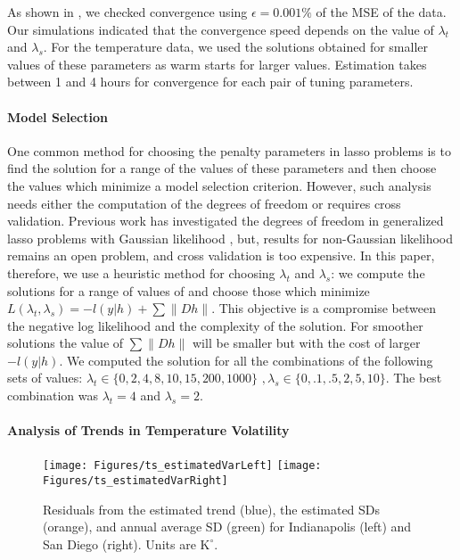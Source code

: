 \documentclass[letterpaper]{article} %
\newcommand{\autoref}{\Cref}
\begin{document}

As shown in \autoref{alg:linADMM}, we checked convergence using
$\epsilon=0.001\%$ of the MSE of the data.
Our simulations indicated that the
convergence speed depends on the value of $\lambda_t$ and
$\lambda_s$. For the temperature data, we used the solutions obtained for smaller values
of these parameters as warm starts for larger values. Estimation takes
between 1 and 4 hours for convergence for each pair of tuning parameters. 


\paragraph{Model Selection}
One common method for choosing the penalty parameters in lasso
problems is to find the solution for a range of the values of these
parameters and then choose the values which minimize a model selection
criterion. However, such analysis needs either the computation of the degrees
of freedom or requires cross validation. Previous work has
investigated the degrees of freedom in 
generalized lasso problems with Gaussian likelihood
\cite{tibshirani_degrees_2012,hu_dual_2015,zeng_geometry_2017}, but,
results for non-Gaussian likelihood remains an open problem, and cross
validation is too expensive. 
In this paper, therefore, we use a heuristic method for choosing $\lambda_t$ and
$\lambda_s$: we compute the solutions for a range of values of
and choose those which minimize
$L(\lambda_t,\lambda_s)=-l(y|h)+ \sum \lVert D h
\lVert$. This objective is a compromise between the negative log
likelihood and the complexity of the solution. For smoother solutions the value of $\sum
\lVert Dh \lVert$ will be smaller but with the cost of larger
$-l(y|h)$. We computed the solution for all the combinations of the
following sets of values: $\lambda_t \in \{0,2,4,8,10,15,200,1000\} \, \, ,
\lambda_s \in \{0,.1,.5,2,5,10\}$. The best combination was
$\lambda_t=4$ and $\lambda_s=2$. 


\paragraph{Analysis of Trends in Temperature Volatility}

\begin{figure}[tb]
  \centering
  \texttt{[image: Figures/ts\_estimatedVarLeft]}
  \texttt{[image: Figures/ts\_estimatedVarRight]}
  \caption{Residuals from the estimated trend
    (blue), the estimated SDs (orange), and annual average SD (green) for
   Indianapolis (left) and San Diego (right). Units are $\textrm{K}^{\circ}$.} 
  \label{fig:avg_change_estimatedSD}
\end{figure} 
\end{document}
